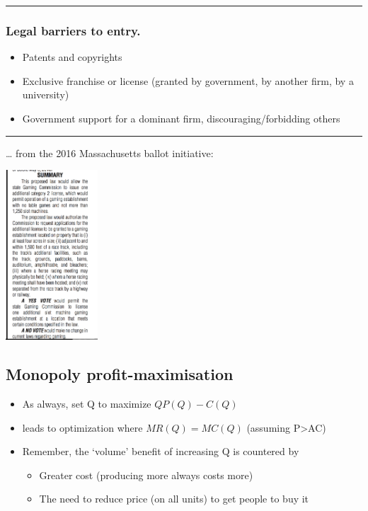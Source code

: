 \documentclass[]{article}
\providecommand{\tightlist}{%
  \setlength{\itemsep}{0pt}\setlength{\parskip}{0pt}}
\begin{document}
\begin{center}\rule{0.5\linewidth}{\linethickness}\end{center}

\hypertarget{legal-barriers-to-entry.}{%
\subsubsection{Legal barriers to entry.}\label{legal-barriers-to-entry.}}

\begin{itemize}
\tightlist
\item
  Patents and copyrights
\item
  Exclusive franchise or license (granted by government, by another firm, by a university)
\item
  Government support for a dominant firm, discouraging/forbidding others
\end{itemize}

\begin{center}\rule{0.5\linewidth}{\linethickness}\end{center}

\ldots{} from the 2016 Massachusetts ballot initiative:

\includegraphics[height=2.5in]{picsfigs/gaming_open.png}

\hypertarget{monopoly-profit-maximisation}{%
\subsection{Monopoly profit-maximisation}\label{monopoly-profit-maximisation}}

\begin{itemize}
\item
  As always, set Q to maximize \(QP(Q)-C(Q)\)
\item
  leads to optimization where \(MR(Q) = MC(Q)\) (assuming P\textgreater{}AC)
\item
  Remember, the `volume' benefit of increasing Q is countered by

  \begin{itemize}
  \tightlist
  \item
    Greater cost (producing more always costs more)
  \item
    The need to reduce price (on all units) to get people to buy it
  \end{itemize}
\end{itemize}
\end{document}
